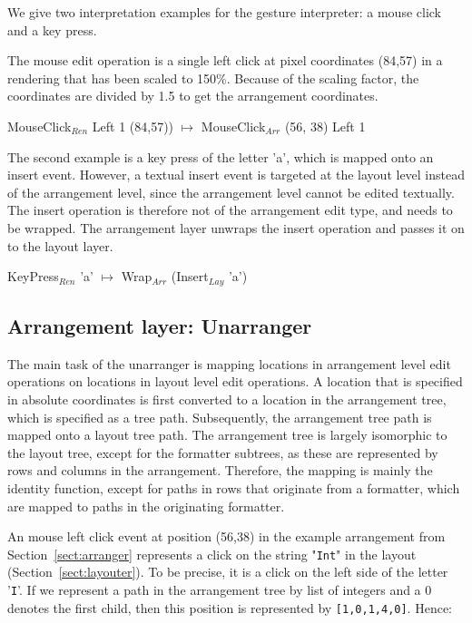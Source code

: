 We give two interpretation examples for the gesture interpreter: a mouse click and a key press. 

The mouse edit operation is a single left click at pixel coordinates (84,57) in a rendering that has been scaled to 150\%.
Because of the scaling factor, the coordinates are divided by 1.5 to get the arrangement coordinates.

\ttfamily
MouseClick$_{Ren}$ Left 1 (84,57)) $\mapsto$ MouseClick$_{Arr}$ (56, 38) Left 1\\
\rmfamily

The second example is a key press of the letter 'a', which is mapped onto an insert event. However, a textual insert event is targeted at the layout level instead of the arrangement level, since the arrangement level cannot be edited textually. The insert operation is therefore not of the arrangement edit type, and needs to be wrapped. The arrangement layer unwraps the insert operation and passes it on to the layout layer.

\ttfamily
KeyPress$_{Ren}$ 'a' $\mapsto$ Wrap$_{Arr}$ (Insert$_{Lay}$ 'a')
\rmfamily


%																
\subsection{Arrangement layer: Unarranger}

The main task of the unarranger is mapping locations in arrangement level edit operations on locations in layout level edit operations. A location that is specified in absolute coordinates is first converted to a location in the arrangement tree, which is specified as a tree path. Subsequently, the arrangement tree path is mapped onto a layout tree path. The arrangement tree is largely isomorphic to the layout tree, except for the formatter subtrees, as these are represented by rows and columns in the arrangement. Therefore, the mapping is mainly the identity function, except for paths in rows that originate from a formatter, which are mapped to paths in the originating formatter.

An mouse left click event at position (56,38) in the example arrangement from Section~\ref{sect:arranger} represents a click on the string "\verb|Int|" in the layout (Section~\ref{sect:layouter}). To be precise, it is a click on the left side of the letter '\verb|I|'. If we represent a path in the arrangement tree by list of integers and a 0 denotes the first child, then this position is represented by \verb|[1,0,1,4,0]|. Hence:

